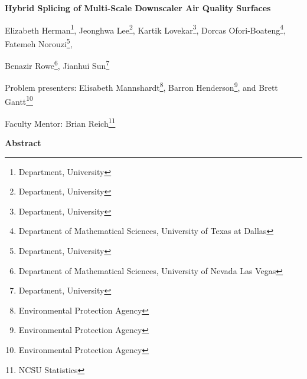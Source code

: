 \documentclass[10pt]{article}
\theoremstyle{plain}
\theoremstyle{definition}
\theoremstyle{remark}
\begin{document}
\centerline{\large \bf Hybrid Splicing of Multi-Scale Downscaler Air Quality Surfaces}

\vspace{.1truein}

\def\thefootnote{\arabic{footnote}}
\begin{center}
  Elizabeth Herman\footnote{Department, University},
  Jeonghwa Lee\footnote{Department, University},
  Kartik Lovekar\footnote{Department, University},
  Dorcas Ofori-Boateng\footnote{Department of Mathematical Sciences, University of Texas at Dallas},
  Fatemeh Norouzi\footnote{Department, University},
  
  Benazir Rowe\footnote{Department of Mathematical Sciences, University of Nevada Las Vegas},
  Jianhui Sun\footnote{Department, University}
\end{center}


\begin{center}
Problem presenters: Elisabeth Mannshardt\footnote{Environmental Protection Agency}, Barron Henderson\footnote{Environmental Protection Agency}, and Brett Gantt\footnote{Environmental Protection Agency}

 
Faculty Mentor: Brian Reich\footnote{NCSU Statistics}
\end{center}


\vspace{.3truein}
\centerline{\bf Abstract}
\end{document}
